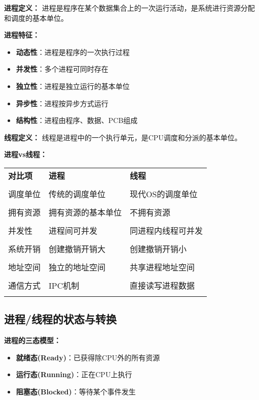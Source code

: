\documentclass[lang=cn,newtx,10pt,scheme=chinese]{../../elegantbook}
\begin{document}
\textbf{进程定义：}
进程是程序在某个数据集合上的一次运行活动，是系统进行资源分配和调度的基本单位。

\textbf{进程特征：}
\begin{itemize}
  \item \textbf{动态性}：进程是程序的一次执行过程
  \item \textbf{并发性}：多个进程可同时存在
  \item \textbf{独立性}：进程是独立运行的基本单位
  \item \textbf{异步性}：进程按异步方式运行
  \item \textbf{结构性}：进程由程序、数据、PCB组成
\end{itemize}

\textbf{线程定义：}
线程是进程中的一个执行单元，是CPU调度和分派的基本单位。

\textbf{进程vs线程：}
\begin{longtable}{@{}p{3cm}p{5cm}p{5cm}@{}}
\toprule
\textbf{对比项} & \textbf{进程} & \textbf{线程} \\\\ \midrule
\endhead

调度单位 & 传统的调度单位 & 现代OS的调度单位 \\\\
拥有资源 & 拥有资源的基本单位 & 不拥有资源 \\\\
并发性 & 进程间可并发 & 同进程内线程可并发 \\\\
系统开销 & 创建撤销开销大 & 创建撤销开销小 \\\\
地址空间 & 独立的地址空间 & 共享进程地址空间 \\\\
通信方式 & IPC机制 & 直接读写进程数据 \\\\

\bottomrule
\end{longtable}

\subsection{进程/线程的状态与转换}

\textbf{进程的三态模型：}
\begin{itemize}
  \item \textbf{就绪态(Ready)}：已获得除CPU外的所有资源
  \item \textbf{运行态(Running)}：正在CPU上执行
  \item \textbf{阻塞态(Blocked)}：等待某个事件发生
\end{itemize}
\end{document}

